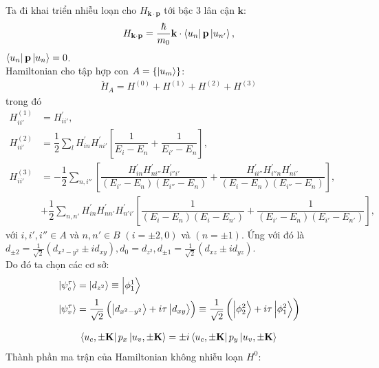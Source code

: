 \documentclass{report}
\newcommand{\f}[2]{\dfrac{#1}{#2}}
\begin{document}
Ta đi khai triển nhiễu loạn cho $H_{\mathbf{k\cdot p}}$ tới bậc 3 lân cận $\mathbf{k}$:
\begin{align}
	H_{\mathbf{k\cdot p}} = \f{\hbar}{m_0} \mathbf{k}\cdot \bra{u_{n}}\mathbf{p}\ket{u_{n'}},
\end{align}
$\bra{u_{n}}\mathbf{p}\ket{u_{n}} =0$. \\
Hamiltonian cho tập hợp con $A = \{ \ket{u_m}\}$:
\begin{align}
	\breve{H}_A = H^{(0)} + H^{(1)} + H^{(2)} + H^{(3)}
\end{align}
trong đó
\begin{align*}
	H^{(1)}_{ii'} & = H^{'}_{ii'},                                                                                                                                                                                              \\
	H^{(2)}_{ii'} & = \f{1}{2} \sum_l H^{'}_{in} H^{'}_{ni'} \left[ \f{1}{E_i - E_n} + \f{1}{E_{i'} - E_n} \right],                                                                                                             \\
	H^{(3)}_{ii'} & = -\f{1}{2} \sum_{n,i''} \left[ \f{ H^{'}_{in}H^{'}_{ni''}H^{'}_{i'' i'} }{ (E_{i'} - E_{n})(E_{i''} - E_{n})} +  \f{ H^{'}_{ii''}H^{'}_{i''n}H^{'}_{n i'} }{ (E_{i} - E_{n})(E_{i''} - E_{n})  } \right] , \\
	              & + \f{1}{2} \sum_{n,n'}^{} H^{'}_{in}H^{'}_{nn'}H^{'}_{n'i'}\left[ \f{1}{ (E_{i} - E_{n})(E_{i} - E_{n'})} + \f{1}{ (E_{i'} - E_{n})(E_{i'} - E_{n'})} \right],
\end{align*}
với $i,i',i'' \in A$ và $n,n' \in B$ $(i = \pm 2,0)$ và $(n = \pm 1)$. Ứng với đó là $d_{\pm 2} = \frac{1}{\sqrt{2}}(d_{x^2-y^2} \pm i d_{xy}), d_0 = d_{z^2}, d_{\pm 1} = \frac{1}{\sqrt{2}}(d_{xz} \pm i d_{yz})$.\\
Do đó ta chọn các cơ sở:
\begin{align*}
	 & \ket{\psi_{c}^{\tau}} = \ket{d_{z^2}} \equiv \ket{\phi^1_1}                                                                                                                      \\
	 & \ket{\mathcal{\psi}_{v}^{\tau}} = \f{1}{\sqrt{2}} \left(\ket{d_{x^2-y^2}} + i\tau \ket{d_{xy}}\right)  \equiv \f{1}{\sqrt{2}} \left(\ket{\phi^2_2} + i\tau \ket{\phi^2_1}\right)
\end{align*}

\begin{align}
	\bra{u_c,\pm \mathbf{K}} p_x \ket{u_v,\pm \mathbf{K}} = \pm i \bra{u_c,\pm \mathbf{K}} p_y \ket{u_v,\pm \mathbf{K}}
\end{align}
Thành phần ma trận của Hamiltonian không nhiễu loạn $H^0$:
\end{document}
